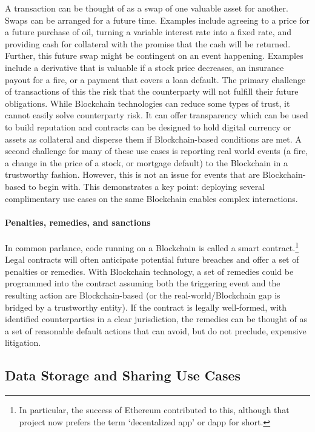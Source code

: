 A transaction can be thought of as a swap of one valuable asset for another. Swaps can be arranged for a future time.
Examples include agreeing to a price for a future purchase of oil, turning a variable interest rate into a fixed rate, and providing cash for collateral with the promise that the cash will be returned.
Further, this future swap might be contingent on an event happening. 
Examples include a derivative that is valuable if a stock price decreases, an insurance payout for a fire, or a payment that covers a loan default.
The primary challenge of transactions of this the risk that the counterparty will not fulfill their future obligations. While Blockchain technologies can reduce some types of trust, it cannot easily solve counterparty risk. 
It can offer transparency which can be used to build reputation and contracts can be designed to hold digital currency or assets as collateral and disperse them if Blockchain-based conditions are met.
A second challenge for many of these use cases is reporting real world events (a fire, a change in the price of a stock, or mortgage default) to the Blockchain in a trustworthy fashion.
However, this is not an issue for events that are Blockchain-based to begin with.
This demonstrates a key point: deploying several complimentary use cases on the same Blockchain enables complex interactions. 


\paragraph{Penalties, remedies, and sanctions}

In common parlance, code running on a Blockchain is called a smart contract.\footnote{In particular, the success of Ethereum contributed to this, although that project now prefers the term `decentalized app' or dapp for short.} Legal contracts will often anticipate potential future breaches and offer a set of penalties or remedies.
With Blockchain technology, a set of remedies could be programmed into the contract assuming both the triggering event and the resulting action are Blockchain-based (or the real-world/Blockchain gap is bridged by a trustworthy entity).
If the contract is legally well-formed, with identified counterparties in a clear jurisdiction, the remedies can be thought of as a set of reasonable default actions that can avoid, but do not preclude, expensive litigation. 


\subsection{Data Storage and Sharing Use Cases}

